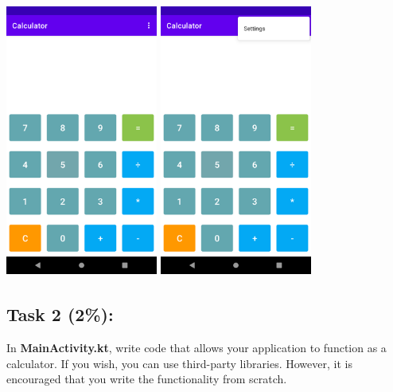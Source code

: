 \documentclass{article}
\begin{document}
\includegraphics[width=5cm, height=9cm]{../tex/img/02-android-overview/practical/calculator-2.png}
\includegraphics[width=5cm, height=9cm]{../tex/img/02-android-overview/practical/calculator-3.png}

\subsection*{Task 2 (2\%):} 
In \textbf{MainActivity.kt}, write code that allows your application to function as a calculator. If you wish, you can use third-party libraries. However, it is encouraged that you write the functionality from scratch. 
\end{document}

